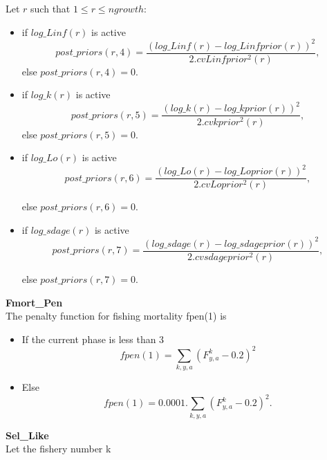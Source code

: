 \documentclass{article}
\begin{document}
    Let $r$ such that $1\leq r \leq ngrowth$:
    \begin{itemize}
        \item if $log\_Linf(r)$ is active
        \begin{equation}
            post\_priors(r,4) = \dfrac{(log\_Linf(r)-log\_Linfprior(r))^2}{2.cvLinfprior^2(r)},
        \end{equation}
        else $post\_priors(r,4)=0.$
        \item if $log\_k(r)$ is active
        \begin{equation}
            post\_priors(r,5) = \dfrac{(log\_k(r)-log\_kprior(r))^2}{2.cvkprior^2(r)},
        \end{equation}
        else  $post\_priors(r,5)=0$.
        \item if $log\_Lo(r)$ is active
        \begin{equation}
            post\_priors(r,6) = \dfrac{(log\_Lo(r)-log\_Loprior(r))^2}{2.cvLoprior^2(r)},
        \end{equation}

        else $post\_priors(r,6)=0$.
        \item if $log\_sdage(r)$ is active
        \begin{equation}
            post\_priors(r,7) = \dfrac{(log\_sdage(r)-log\_sdageprior(r))^2}{2.cvsdageprior^2(r)},
        \end{equation}

        else $post\_priors(r,7)=0.$
    \end{itemize}



\textbf{Fmort\_Pen}\\
The penalty function for fishing mortality fpen(1) is

\begin{itemize}
    \item If the current phase is less than 3
    \begin{equation}
        fpen(1)=\sum_{k,y,a}(F^k_{y,a}-0.2)^2
    \end{equation}
    \item Else
    \begin{equation}
        fpen(1)=0.0001.\sum_{k,y,a}(F^k_{y,a}-0.2)^2.
    \end{equation}
\end{itemize}

\textbf{Sel\_Like}\\

Let the fishery number k
\end{document}
